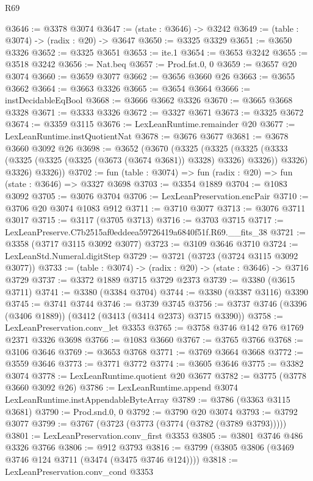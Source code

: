 \begin{lexlean}{R69}
\begin{coremodule}
@3646 := @3378 @3074
@3647 := (state : @3646) -> @3242
@3649 := (table : @3074) -> (radix : @20) -> @3647
@3650 := @3325 @3329
@3651 := @3650 @3326
@3652 := @3325 @3651
@3653 := ite.{1}
@3654 := @3653 @3242
@3655 := @3518 @3242
@3656 := Nat.beq
@3657 := Prod.fst.{0, 0}
@3659 := @3657 @20 @3074
@3660 := @3659 @3077
@3662 := @3656 @3660 @26
@3663 := @3655 @3662
@3664 := @3663 @3326
@3665 := @3654 @3664
@3666 := instDecidableEqBool
@3668 := @3666 @3662 @3326
@3670 := @3665 @3668 @3328
@3671 := @3333 @3326
@3672 := @3327 @3671
@3673 := @3325 @3672
@3674 := @3359 @3115
@3676 := LexLeanRuntime.remainder @20
@3677 := LexLeanRuntime.instQuotientNat
@3678 := @3676 @3677
@3681 := @3678 @3660 @3092 @26
@3698 := @3652
    (@3670
      (@3325
        (@3325
          (@3325 (@3333 (@3325 (@3325 (@3325 (@3673 (@3674 @3681)) @3328) @3326) @3326)) @3326)
          @3326)
        @3326))
@3702 := fun (table : @3074) => fun (radix : @20) => fun (state : @3646) => @3327 @3698
@3703 := @3354 @1889
@3704 := @1083 @3092
@3705 := @3076 @3704
@3706 := LexLeanPreservation.encPair
@3710 := @3706 @20 @3074 @1083 @912
@3711 := @3710 @3077
@3713 := @3076 @3711 @3017
@3715 := @3117 (@3705 @3713)
@3716 := @3703 @3715
@3717 := LexLeanPreserve.C7b2515af0eddeea59726419a6840f51f.R69.__fits_38
@3721 := @3358 (@3717 @3115 @3092 @3077)
@3723 := @3109 @3646 @3710
@3724 := LexLeanStd.Numeral.digitStep
@3729 := @3721 (@3723 (@3724 @3115 @3092 @3077))
@3733 := (table : @3074) -> (radix : @20) -> (state : @3646) -> @3716 @3729
@3737 := @3372 @1889 @3715 @3729 @2373
@3739 := @3380 (@3615 @3711)
@3741 := @3380 (@3384 @3704)
@3744 := @3380 (@3387 @3116) @3390
@3745 := @3741 @3744
@3746 := @3739 @3745
@3756 := @3737 @3746 (@3396 (@3406 @1889)) (@3412 (@3413 (@3414 @2373) @3715 @3390))
@3758 := LexLeanPreservation.conv_let @3353
@3765 := @3758 @3746 @142 @76 @1769 @2371 @3326 @3698
@3766 := @1083 @3660
@3767 := @3765 @3766
@3768 := @3106 @3646
@3769 := @3653 @3768
@3771 := @3769 @3664 @3668
@3772 := @3559 @3646
@3773 := @3771 @3772
@3774 := @3605 @3646
@3775 := @3382 @3074
@3778 := LexLeanRuntime.quotient @20 @3677
@3782 := @3775 (@3778 @3660 @3092 @26)
@3786 := LexLeanRuntime.append @3074 LexLeanRuntime.instAppendableByteArray
@3789 := @3786 (@3363 @3115 @3681)
@3790 := Prod.snd.{0, 0}
@3792 := @3790 @20 @3074
@3793 := @3792 @3077
@3799 := @3767 (@3723 (@3773 (@3774 (@3782 (@3789 @3793)))))
@3801 := LexLeanPreservation.conv_first @3353
@3805 := @3801 @3746 @486 @3326 @3766
@3806 := @912 @3793
@3816 := @3799 (@3805 @3806 (@3469 @3746 @124 @3711 (@3474 (@3475 @3746 @124))))
@3818 := LexLeanPreservation.conv_cond @3353

\end{coremodule}
\end{lexlean}
